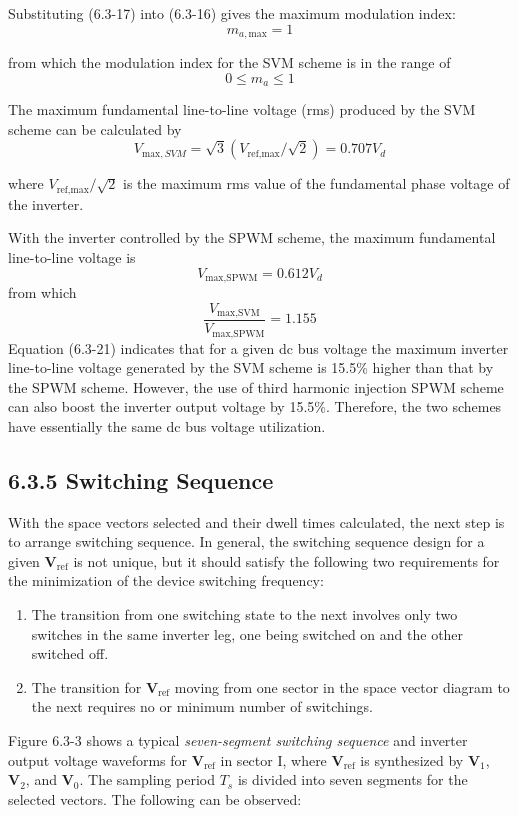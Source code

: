 \documentclass[letterpaper,12pt]{article}
\begin{document}
Substituting (6.3-17) into (6.3-16) gives the maximum modulation index:
\[
m_{a,\text{max}} = 1
\]

from which the modulation index for the SVM scheme is in the range of
\[
0 \leq m_a \leq 1 \tag{6.3-18}
\]

The maximum fundamental line-to-line voltage (rms) produced by the SVM scheme can be calculated by
\[
V_{\text{max},SVM} = \sqrt{3} (V_{\text{ref},\text{max}}/\sqrt{2}) = 0.707V_d \tag{6.3-19}
\]

where \( V_{\text{ref},\text{max}}/\sqrt{2} \) is the maximum rms value of the fundamental phase voltage of the inverter.

With the inverter controlled by the SPWM scheme, the maximum fundamental line-to-line voltage is
\[
V_{\text{max,SPWM}} = 0.612V_d
\]
from which
\[
\frac{V_{\text{max,SVM}}}{V_{\text{max,SPWM}}} = 1.155
\]
Equation (6.3-21) indicates that for a given dc bus voltage the maximum inverter line-to-line voltage generated by the SVM scheme is 15.5\% higher than that by the SPWM scheme. However, the use of third harmonic injection SPWM scheme can also boost the inverter output voltage by 15.5\%. Therefore, the two schemes have essentially the same dc bus voltage utilization.

\subsection*{6.3.5 Switching Sequence}

With the space vectors selected and their dwell times calculated, the next step is to arrange switching sequence. In general, the switching sequence design for a given \( \mathbf{V}_{\text{ref}} \) is not unique, but it should satisfy the following two requirements for the minimization of the device switching frequency:

\begin{enumerate}
    \item The transition from one switching state to the next involves only two switches in the same inverter leg, one being switched on and the other switched off.
    \item The transition for \( \mathbf{V}_{\text{ref}} \) moving from one sector in the space vector diagram to the next requires no or minimum number of switchings.
\end{enumerate}

Figure 6.3-3 shows a typical \textit{seven-segment switching sequence} and inverter output voltage waveforms for \( \mathbf{V}_{\text{ref}} \) in sector I, where \( \mathbf{V}_{\text{ref}} \) is synthesized by \( \mathbf{V}_1 \), \( \mathbf{V}_2 \), and \( \mathbf{V}_0 \). The sampling period \( T_s \) is divided into seven segments for the selected vectors. The following can be observed:
\end{document}
